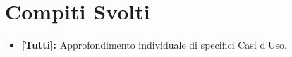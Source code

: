 \documentclass[../verbale-2017-01-05.tex]{subfiles}
\begin{document}
	\section{Compiti Svolti}
	\begin{itemize}
		\item \textbf{[Tutti]:} Approfondimento individuale di specifici Casi d'Uso.
	\end{itemize}
\end{document}
